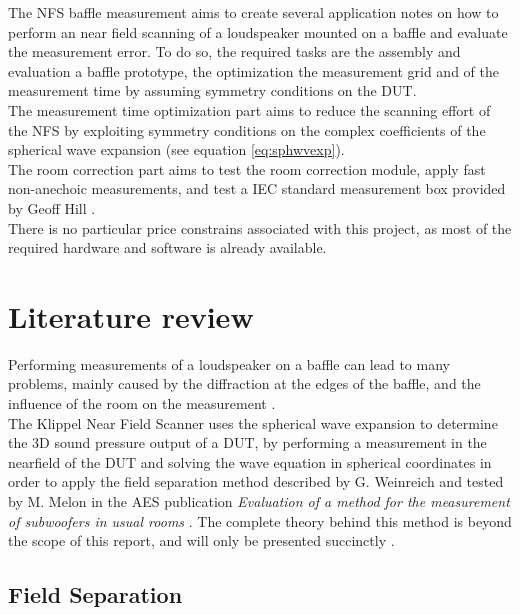 \documentclass{report}
\begin{document}
The NFS baffle measurement aims to create several application notes on how to perform an near field scanning of a loudspeaker mounted on a baffle and evaluate the measurement error. To do so, the required tasks are the assembly and evaluation a baffle prototype, the optimization the measurement grid and of the measurement time by assuming symmetry conditions on the DUT.\\

The measurement time optimization part aims to reduce the scanning effort of the NFS by exploiting symmetry conditions on the complex coefficients of the spherical wave expansion (see equation \ref{eq:sphwvexp}). \\

The room correction part aims to test the room correction module, apply fast non-anechoic measurements, and test a IEC standard measurement box provided by Geoff Hill \citep[see][]{tetbox}. \\

There is no particular price constrains associated with this project, as most of the required hardware and software is already available. 

\newpage

\section{Literature review}

Performing measurements of a loudspeaker on a baffle can lead to many problems, mainly caused by the diffraction at the edges of the baffle, and the influence of the room on the measurement \cite{LIS}.\\
The Klippel Near Field Scanner uses the spherical wave expansion to determine the 3D sound pressure output of a DUT, by performing a measurement in the nearfield of the DUT and solving the wave equation in spherical coordinates in order to apply the field separation method described by G. Weinreich and tested by M. Melon in the AES publication \textit{Evaluation of a method for the measurement of subwoofers in usual rooms} \cite{melon1}. The complete theory behind this method is beyond the scope of this report, and will only be presented succinctly \citep[see][chap.~6]{Fourier} \citep[see][sect.~3]{aeshs}. 

\subsection{Field Separation}
\end{document}
